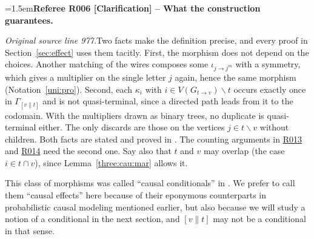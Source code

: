 \documentclass[12pt]{amsart}
\newcommand{\RefereeRemark}[4]{%
  \par\medskip\begingroup\normalfont\small\color{RefereePurple}%
  \emergencystretch=1.5em\noindent\textbf{Referee R#1 [#2] -- #3.}\par\nobreak\noindent #4\par
  \endgroup\medskip
}
\theoremstyle{plain}
\theoremstyle{definition}
\theoremstyle{remark}
\numberwithin{equation}{section}
\theoremstyle{plain}
\newcommand{\0}{\emptyset}
\newcommand{\mi}{\smallsetminus}
\newcommand{\stri}{\Gamma}
\begin{document}
\hypertarget{review-006}{}\RefereeRemark{006}{Clarification}{What the construction guarantees}{%
\textit{Original source line 977.}\quad Two facts make the definition precise, and every proof in Section~\ref{sec:effect} uses them tacitly. First, the morphism does not depend on the choices. Another matching of the wires composes some $\iota_{j \rightarrow j^m}$ with a symmetry, which gives a multiplier on the single letter $j$ again, hence the same morphism (Notation~\ref{uni:pro}). Second, each $\kappa_i$ with $i \in V(G_{t \rightarrow v}) \mi t$ occurs exactly once in $\stri_{[v \| t]}$ and is not quasi-terminal, since a directed path leads from it to the codomain. With the multipliers drawn as binary trees, no duplicate is quasi-terminal either. The only discards are those on the vertices $j \in t \mi v$ without children. Both facts are stated and proved in \cite[Definition~5.4]{YinZhangModularity}. The counting arguments in \hyperlink{review-013}{R013} and \hyperlink{review-014}{R014} need the second one. Say also that $t$ and $v$ may overlap (the case $i \in t \cap v$), since Lemma~\ref{three:cau:mar} allows it.
}

This class of morphisms was called ``causal conditionals'' in \cite[\S~4]{Fong:thesis}. We prefer to call them ``causal effects'' here because of their eponymous counterparts in probabilistic causal modeling mentioned earlier, but also because we will study a notion of a conditional in the next section, and $[v \| t]$ may not be a conditional in that sense.
\end{document}

